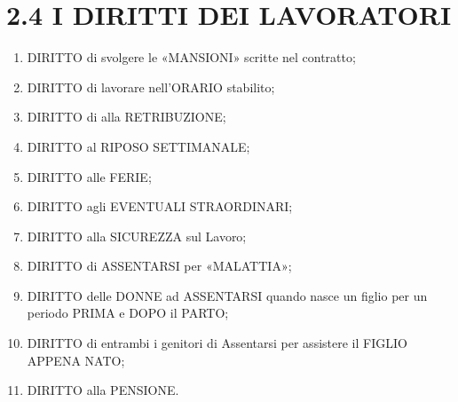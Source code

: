\documentclass[letterpaper,10pt,italian]{sphinxmanual}
\begin{document}
\section{2.4 \sphinxhyphen{} I DIRITTI DEI LAVORATORI}
\label{\detokenize{2.DIRITTI ECONOMICI-LAVORO:i-diritti-dei-lavoratori}}\begin{enumerate}
%
\item {} 
\sphinxAtStartPar
DIRITTO di svolgere le «MANSIONI» scritte nel contratto;

\item {} 
\sphinxAtStartPar
DIRITTO di lavorare nell’ORARIO stabilito;

\item {} 
\sphinxAtStartPar
DIRITTO di alla RETRIBUZIONE;

\item {} 
\sphinxAtStartPar
DIRITTO al RIPOSO SETTIMANALE;

\item {} 
\sphinxAtStartPar
DIRITTO alle FERIE;

\item {} 
\sphinxAtStartPar
DIRITTO agli EVENTUALI STRAORDINARI;

\item {} 
\sphinxAtStartPar
DIRITTO alla SICUREZZA sul Lavoro;

\item {} 
\sphinxAtStartPar
DIRITTO di ASSENTARSI per «MALATTIA»;

\item {} 
\sphinxAtStartPar
DIRITTO delle DONNE ad ASSENTARSI quando nasce un figlio per un periodo PRIMA e DOPO il PARTO;

\item {} 
\sphinxAtStartPar
DIRITTO di entrambi i genitori di Assentarsi per assistere il FIGLIO APPENA NATO;

\item {} 
\sphinxAtStartPar
DIRITTO alla PENSIONE.

\end{enumerate}
\end{document}
